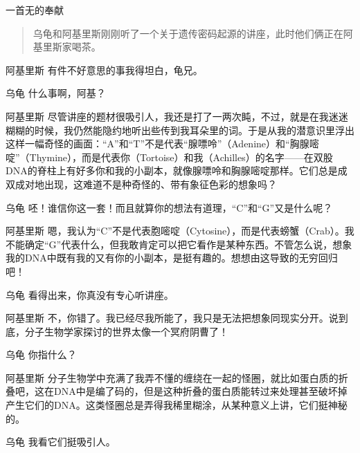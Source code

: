 
\begin{dialog}{一首无的奉献\label{abcd}}

\begin{quote}
乌龟和阿基里斯刚刚听了一个关于遗传密码起源的讲座，此时他们俩正在阿基里斯家喝茶。
\end{quote}

\begin{dialogue}

\item[阿基里斯]有件不好意思的事我得坦白，龟兄。

\item[乌龟]什么事啊，阿基？

\item[阿基里斯]尽管讲座的题材很吸引人，我还是打了一两次盹，不过，就是在我迷迷糊糊的时候，我仍然能隐约地听出些传到我耳朵里的词。于是从我的潜意识里浮出这样一幅奇怪的画面：“A”和“T”不是代表“腺嘌呤”（Adenine）和“胸腺嘧啶”（Thymine），而是代表你（Tortoise）和我（Achilles）的名字——在双股DNA的脊柱上有好多你和我的小副本，就像腺嘌呤和胸腺嘧啶那样。它们总是成双成对地出现，这难道不是种奇怪的、带有象征色彩的想象吗？

\item[乌龟]呸！谁信你这一套！而且就算你的想法有道理，“C”和“G”又是什么呢？

\item[阿基里斯]嗯，我认为“C”不是代表胞嘧啶（Cytosine），而是代表螃蟹（Crab）。我不能确定“G”代表什么，但我敢肯定可以把它看作是某种东西。不管怎么说，想象我的DNA中既有我的又有你的小副本，是挺有趣的。想想由这导致的无穷回归吧！

\item[乌龟]看得出来，你真没有专心听讲座。

\item[阿基里斯]不，你错了。我已经尽我所能了，我只是无法把想象同现实分开。说到底，分子生物学家探讨的世界太像一个冥府阴曹了！

\item[乌龟]你指什么？

\item[阿基里斯]分子生物学中充满了我弄不懂的缠绕在一起的怪圈，就比如蛋白质的折叠吧，这在DNA中是编了码的，但是这种折叠的蛋白质能转过来处理甚至破坏掉产生它们的DNA。这类怪圈总是弄得我稀里糊涂，从某种意义上讲，它们挺神秘的。

\item[乌龟]我看它们挺吸引人。


\end{dialogue}
\end{dialog}
